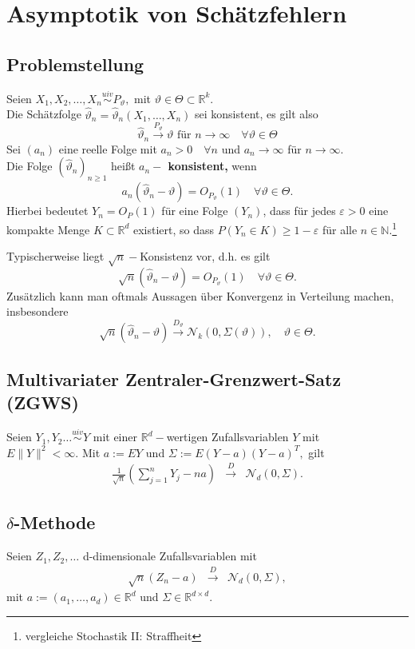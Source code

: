 \documentclass[a4paper,11pt,twoside,titlepage]{article}
\newcommand{\R}{{\mathbb R}}
\newcommand{\N}{{\mathbb N}}
\newcommand\NN{ \mathcal{N} } %
\newcommand{\uiv}{\ensuremath{\stackrel{uiv}{\sim}}}
\begin{document}
\cleardoublepage
\section{Asymptotik von Schätzfehlern}
\subsection{Problemstellung}
Seien $X_1,X_2,\ldots,X_n\uiv P_\vartheta,$ mit
$\vartheta\in\Theta\subset\R^k$.\\
Die Schätzfolge $\hat{\vartheta}_n=\hat\vartheta_n(X_1,\ldots,X_n)$ sei konsistent,
es gilt also
$$\hat\vartheta_n\stackrel{P_\vartheta}{\rightarrow}
\vartheta\mbox{ für } n\rightarrow \infty\quad
\forall\vartheta\in\Theta$$
Sei $(a_n)$ eine reelle Folge
mit $a_n>0\quad\forall n$ und $a_n\rightarrow\infty$ für
$n\rightarrow\infty.$\\
Die Folge $(\hat\vartheta_n)_{n\geq 1}$ heißt {\bf $a_n-$ konsistent,} wenn
$$ a_n(\hat\vartheta_n-\vartheta)=O_{P_\vartheta}(1) \quad \forall
\vartheta\in\Theta.$$ Hierbei bedeutet $Y_n=O_{P}(1)$
für eine Folge $(Y_n)$, dass für jedes $\varepsilon>0$ eine kompakte
Menge $K\subset\R^d$ existiert, so dass $P(Y_n\in K)\geq 1-\varepsilon$
für alle $n\in \N.$\footnote{vergleiche Stochastik II: Straffheit}

Typischerweise liegt $\sqrt{n}-$Konsistenz vor, d.h. es gilt
$$\sqrt{n}(\hat\vartheta_n-\vartheta)=O_{P_\vartheta}(1) \quad
\forall \vartheta\in\Theta.$$ Zusätzlich  kann man oftmals
Aussagen über Konvergenz in Verteilung machen, insbesondere
$$\sqrt{n}(\hat\vartheta_n-\vartheta)\stackrel{D_\vartheta}{\rightarrow}
\NN_k(0,\Sigma(\vartheta)), \quad\vartheta\in\Theta.$$

\subsection{Multivariater Zentraler-Grenzwert-Satz (ZGWS)}
Seien $Y_1,Y_2\ldots\uiv Y$ mit
einer $\R^d-$wertigen Zufallsvariablen $Y$ mit\\ $E\|Y\|^2<\infty.$
Mit $a:=EY$ und $\Sigma:=E(Y-a)(Y-a)^T,$ gilt
\begin{eqnarray*}
\frac1{\sqrt{n}}\left(\sum_{j=1}^n Y_j -
n a\right)  &\stackrel{D}{\rightarrow}& \NN_d(0,\Sigma).
\end{eqnarray*}
\newpage
\subsection{$\delta$-Methode}
Seien $Z_1,Z_2,\ldots $ d-dimensionale Zufallsvariablen mit
\begin{eqnarray*}
\sqrt{n} \left(Z_n - a\right) &\stackrel{D}{\rightarrow}& \NN_d(0,\Sigma),
\end{eqnarray*}
mit $a:=(a_1,\ldots,a_d)\in\R^d$ und $\Sigma\in\R^{d\times d}.$
\end{document}
